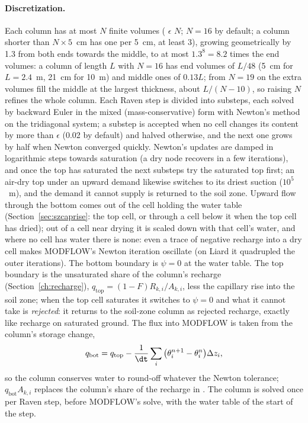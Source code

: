 \paragraph{Discretization.} Each column has at most $N$ finite volumes ( $\epsilon$ $N$;
$N=16$ by default; a column shorter than $N\times5$~cm has one per 5~cm, at least 3), growing geometrically by 1.3 from
both ends towards the middle, to at most $1.3^8=8.2$ times the end volumes: a column of length $L$ with $N=16$ has end
volumes of $L/48$ (5~cm for $L=2.4$~m, 21~cm for 10~m) and middle ones of $0.13L$; from $N=19$ on the extra volumes fill
the middle at the largest thickness, about $L/(N-10)$, so raising $N$ refines the whole column. Each Raven step
is divided into substeps, each solved by backward Euler in the mixed (mass-conservative) form with Newton's method on
the tridiagonal system; a substep is accepted when no cell changes its content by more than $\epsilon$ (0.02 by
default) and halved otherwise, and the next one grows by half when Newton converged quickly. Newton's updates are
damped in logarithmic steps towards saturation (a dry node recovers in a few iterations), and once the top has
saturated the next substeps try the saturated top first; an air-dry top under an upward demand likewise switches to
its driest suction ($10^5$~m), and the demand it cannot supply is returned to the soil zone. Upward flow through the
bottom comes out of the cell holding the water table (Section~\ref{sec:szcaprise}: the top cell, or through
 a cell below it when the top cell has dried); out of a cell near drying it is scaled down with that
cell's water, and where no cell has water there is none: even a trace of negative recharge into a dry cell makes
MODFLOW's Newton iteration oscillate (on Liard it quadrupled the outer iterations). The bottom boundary is
$\psi=0$ at the water table. The top boundary is the unsaturated share of the column's recharge (Section~\ref{ch:recharge}),
$q_{\mathrm{top}}=(1-F)R_{k,i}/A_{k,i}$, less the capillary rise into the soil zone; when the top cell saturates it switches to
$\psi=0$ and what it cannot take is \emph{rejected}: it returns to the soil-zone column as rejected recharge, exactly
like recharge on saturated ground. The flux into MODFLOW is taken from the column's storage change,
\begin{equation}
q_{\mathrm{bot}}=q_{\mathrm{top}}-\frac{1}{\dt}\sum_i\big(\theta_i^{n+1}-\theta_i^{n}\big)\Delta z_i,
\end{equation}
so the column conserves water to round-off whatever the Newton tolerance; $q_{\mathrm{bot}}A_{k,i}$ replaces the column's
share of the recharge in . The column is solved once per Raven step, before MODFLOW's solve, with the
water table of the start of the step.

